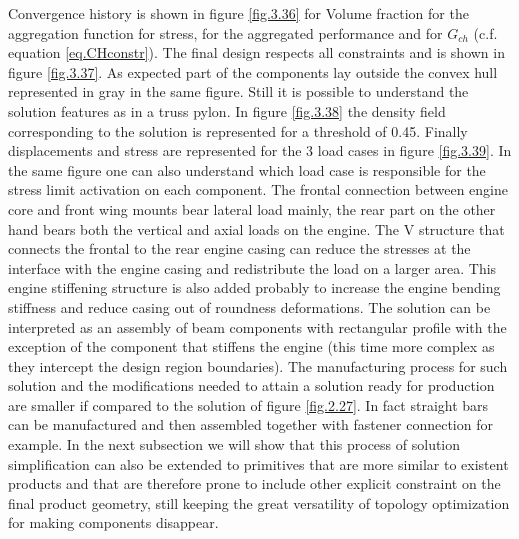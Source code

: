       Convergence history is shown in figure \ref{fig.3.36} for Volume fraction for the aggregation function for stress, for the aggregated performance and for $G_{ch}$ (c.f. equation \ref{eq.CHconstr}). The final design respects all constraints and is shown in figure \ref{fig.3.37}. As expected part of the components lay outside the convex hull represented in gray in the same figure. Still it is possible to understand the solution features as in a truss pylon. In figure \ref{fig.3.38} the density field corresponding to the solution is represented for a threshold of 0.45. Finally displacements and stress are represented for the 3 load cases in figure \ref{fig.3.39}. In the same figure one can also understand  which load case is responsible for the stress limit activation on each component. The frontal connection between engine core and front wing mounts bear lateral load mainly, the rear part on the other hand bears both the vertical and axial loads on the engine. The V structure that connects the frontal to the rear engine casing can reduce the stresses at the interface with the engine casing and redistribute the load on a larger area. This engine stiffening structure is also added probably to increase the engine bending stiffness and reduce casing out of roundness deformations. The solution can be interpreted as an assembly of beam components with rectangular profile with the exception of the component that stiffens the engine (this time more complex as they intercept the design region boundaries). The manufacturing process for such solution and the modifications needed to attain a solution ready for production  are smaller if compared to the solution of figure \ref{fig.2.27}. In fact straight bars can be manufactured and then assembled together with fastener connection for example. In the next subsection we will show that this process of solution simplification can also be extended to primitives that are more similar to existent products and that are therefore prone to include other explicit constraint on the final product geometry, still keeping the great versatility of topology optimization for making components disappear.
